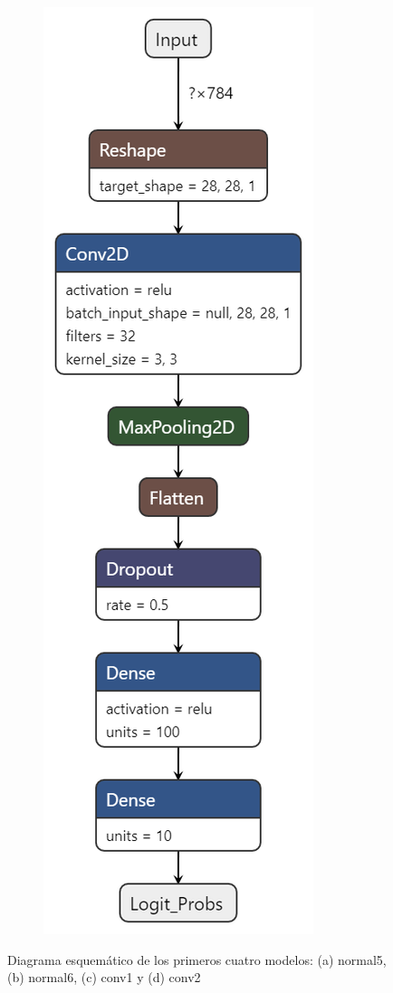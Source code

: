 \documentclass[11pt]{article}
\begin{document}
\begin{figure}[H]
\begin{subfigure}[c]{0.24\textwidth}
        \caption{}
        \label{fig:CNN1}
    \end{subfigure}
    \begin{subfigure}[c]{0.24\textwidth}
        \centering
        \includegraphics[width = \textwidth]{conv2.png}
        \caption{}
        \label{fig:CNN2}
    \end{subfigure}
    \caption{Diagrama esquemático de los primeros cuatro modelos: (a) normal5, (b) normal6, (c) conv1 y (d) conv2}
\end{figure}
\end{document}
